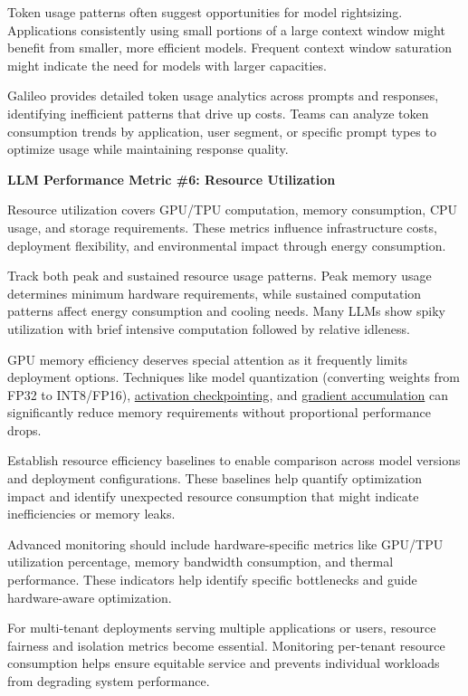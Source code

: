 \documentclass[
  letterpaper,
  DIV=11,
  numbers=noendperiod,
  oneside]{scrreprt}
\begin{document}
\begin{tcolorbox}
Token usage patterns often suggest opportunities for model rightsizing.
Applications consistently using small portions of a large context window
might benefit from smaller, more efficient models. Frequent context
window saturation might indicate the need for models with larger
capacities.

Galileo provides detailed token usage analytics across prompts and
responses, identifying inefficient patterns that drive up costs. Teams
can analyze token consumption trends by application, user segment, or
specific prompt types to optimize usage while maintaining response
quality.

\textbf{LLM Performance Metric \#6: Resource Utilization}

Resource utilization covers GPU/TPU computation, memory consumption, CPU
usage, and storage requirements. These metrics influence infrastructure
costs, deployment flexibility, and environmental impact through energy
consumption.

Track both peak and sustained resource usage patterns. Peak memory usage
determines minimum hardware requirements, while sustained computation
patterns affect energy consumption and cooling needs. Many LLMs show
spiky utilization with brief intensive computation followed by relative
idleness.

GPU memory efficiency deserves special attention as it frequently limits
deployment options. Techniques like model quantization (converting
weights from FP32 to INT8/FP16),
\href{https://arxiv.org/abs/2501.01792}{activation checkpointing}, and
\href{https://medium.com/biased-algorithms/gradient-accumulation-in-pytorch-36962825fa44}{gradient
accumulation} can significantly reduce memory requirements without
proportional performance drops.

Establish resource efficiency baselines to enable comparison across
model versions and deployment configurations. These baselines help
quantify optimization impact and identify unexpected resource
consumption that might indicate inefficiencies or memory leaks.

Advanced monitoring should include hardware-specific metrics like
GPU/TPU utilization percentage, memory bandwidth consumption, and
thermal performance. These indicators help identify specific bottlenecks
and guide hardware-aware optimization.

For multi-tenant deployments serving multiple applications or users,
resource fairness and isolation metrics become essential. Monitoring
per-tenant resource consumption helps ensure equitable service and
prevents individual workloads from degrading system performance.


\end{tcolorbox}
\end{document}
